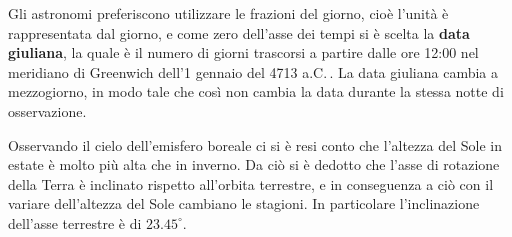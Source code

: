 Gli astronomi preferiscono utilizzare le frazioni del giorno, cioè l'unità è rappresentata dal giorno, e come zero dell'asse dei tempi si è scelta la \textbf{data giuliana}, la quale è il numero di giorni trascorsi a partire dalle ore 12:00 nel meridiano di Greenwich dell'1 gennaio del 4713 a.C.\,. La data giuliana cambia a mezzogiorno, in modo tale che così non cambia la data durante la stessa notte di osservazione.

Osservando il cielo dell'emisfero boreale ci si è resi conto che l'altezza del Sole in estate è molto più alta che in inverno. Da ciò si è dedotto che l'asse di rotazione della Terra è inclinato rispetto all'orbita terrestre, e in conseguenza a ciò con il variare dell'altezza del Sole cambiano le stagioni. In particolare l'inclinazione dell'asse terrestre è di $23.45^\circ$.